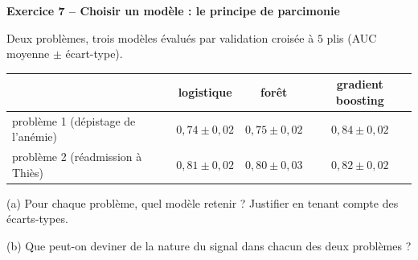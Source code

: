 \documentclass[10pt,a4paper]{article}
\newcommand{\repligne}{\par\vspace{0.42cm}\noindent\dotfill}
\begin{document}
\vspace{0.45cm}
\textbf{\large Exercice 7 -- Choisir un modèle : le principe de parcimonie}
\vspace{0.15cm}

Deux problèmes, trois modèles évalués par validation croisée à $5$ plis (AUC moyenne $\pm$ écart-type).

\vspace{0.1cm}
{\small \renewcommand{\arraystretch}{1.5}\begin{tabular}{|l|c|c|c|}\hline
 & logistique & forêt & gradient boosting\\\hline
problème 1 (dépistage de l'anémie) & $0{,}74 \pm 0{,}02$ & $0{,}75\pm 0{,}02$ & $0{,}84\pm 0{,}02$\\\hline
problème 2 (réadmission à Thiès) & $0{,}81 \pm 0{,}02$ & $0{,}80\pm 0{,}03$ & $0{,}82\pm 0{,}02$\\\hline
\end{tabular}}

\vspace{0.2cm}
(a) Pour chaque problème, quel modèle retenir ? Justifier en tenant compte des écarts-types.
\repligne\repligne\repligne

\vspace{0.15cm}
(b) Que peut-on deviner de la nature du signal dans chacun des deux problèmes ?
\repligne\repligne
\end{document}
